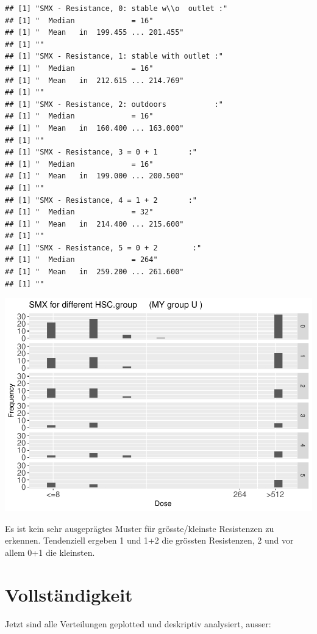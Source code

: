 \documentclass[
]{article}
\begin{document}
\begin{verbatim}
## [1] "SMX - Resistance, 0: stable w\\o  outlet :"
## [1] "  Median             = 16"
## [1] "  Mean   in  199.455 ... 201.455"
## [1] ""
## [1] "SMX - Resistance, 1: stable with outlet :"
## [1] "  Median             = 16"
## [1] "  Mean   in  212.615 ... 214.769"
## [1] ""
## [1] "SMX - Resistance, 2: outdoors           :"
## [1] "  Median             = 16"
## [1] "  Mean   in  160.400 ... 163.000"
## [1] ""
## [1] "SMX - Resistance, 3 = 0 + 1       :"
## [1] "  Median             = 16"
## [1] "  Mean   in  199.000 ... 200.500"
## [1] ""
## [1] "SMX - Resistance, 4 = 1 + 2       :"
## [1] "  Median             = 32"
## [1] "  Mean   in  214.400 ... 215.600"
## [1] ""
## [1] "SMX - Resistance, 5 = 0 + 2        :"
## [1] "  Median             = 264"
## [1] "  Mean   in  259.200 ... 261.600"
## [1] ""
\end{verbatim}

\includegraphics{Verteilungen_files/figure-latex/unnamed-chunk-56-1.pdf}

Es ist kein sehr ausgeprägtes Muster für grösste/kleinste Resistenzen zu
erkennen. Tendenziell ergeben 1 und 1+2 die grössten Resistenzen, 2 und
vor allem 0+1 die kleinsten.

\hypertarget{vollstuxe4ndigkeit}{%
\section{Vollständigkeit}\label{vollstuxe4ndigkeit}}

Jetzt sind alle Verteilungen geplotted und deskriptiv analysiert,
ausser:
\end{document}

